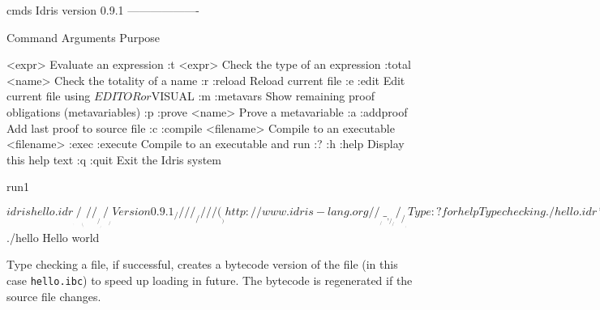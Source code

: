 \begin{SaveVerbatim}{cmds}
Idris version 0.9.1
-------------------

   Command         Arguments   Purpose
                               
   <expr>                      Evaluate an expression
   :t              <expr>      Check the type of an expression
   :total          <name>      Check the totality of a name
   :r :reload                  Reload current file
   :e :edit                    Edit current file using $EDITOR or $VISUAL
   :m :metavars                Show remaining proof obligations (metavariables)
   :p :prove       <name>      Prove a metavariable
   :a :addproof                Add last proof to source file
   :c :compile     <filename>  Compile to an executable <filename>
   :exec :execute              Compile to an executable and run
   :? :h :help                 Display this help text
   :q :quit                    Exit the Idris system
\end{SaveVerbatim}


\begin{SaveVerbatim}{run1}

$ idris hello.idr
     ____    __     _                                          
    /  _/___/ /____(_)____                                     
    / // __  / ___/ / ___/     Version 0.9.1
  _/ // /_/ / /  / (__  )      http://www.idris-lang.org/      
 /___/\__,_/_/  /_/____/       Type :? for help        

Type checking ./hello.idr
*hello> :t main 
main : IO ()
*hello> :c hello 
*hello> :q 
Bye bye
$ ./hello 
Hello world

\end{SaveVerbatim}


\noindent
Type checking a file, if successful, creates a bytecode version of the file (in this
case \texttt{hello.ibc}) to speed up loading in future. The bytecode is regenerated if
the source file changes.

